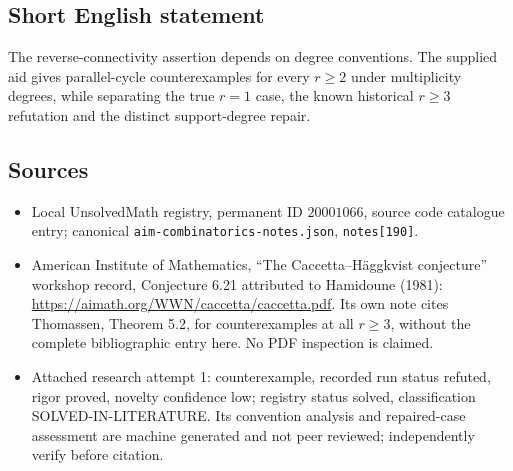 \documentclass[11pt]{article}
\begin{document}
\subsection{Short English statement}
The reverse-connectivity assertion depends on degree conventions. The supplied aid gives parallel-cycle counterexamples for every $r\ge2$ under multiplicity degrees, while separating the true $r=1$ case, the known historical $r\ge3$ refutation and the distinct support-degree repair.
\subsection{Sources}
\begin{itemize}
\item Local UnsolvedMath registry, permanent ID $20001066$, source code catalogue entry; canonical \texttt{aim-combinatorics-notes.json}, \texttt{notes[190]}.
\item American Institute of Mathematics, ``The Caccetta--H\"aggkvist conjecture'' workshop record, Conjecture 6.21 attributed to Hamidoune (1981): \url{https://aimath.org/WWN/caccetta/caccetta.pdf}. Its own note cites Thomassen, Theorem 5.2, for counterexamples at all $r\ge3$, without the complete bibliographic entry here. No PDF inspection is claimed.
\item Attached research attempt 1: counterexample, recorded run status refuted, rigor proved, novelty confidence low; registry status solved, classification SOLVED-IN-LITERATURE. Its convention analysis and repaired-case assessment are machine generated and not peer reviewed; independently verify before citation.
\end{itemize}
\end{document}
